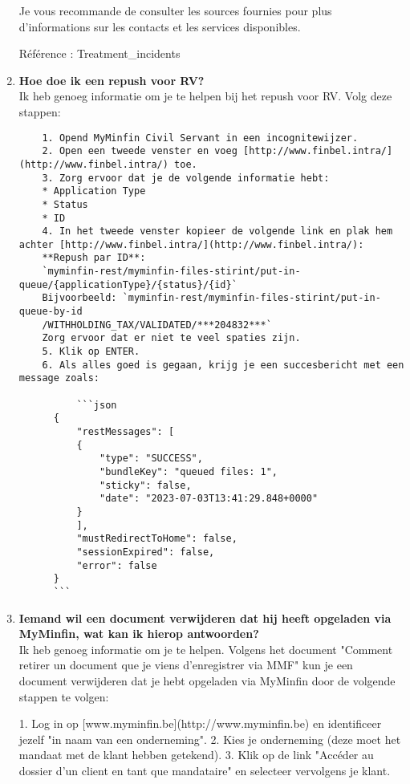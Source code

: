 \begin{enumerate}
    Je vous recommande de consulter les sources fournies pour plus d'informations sur les contacts et les services disponibles.
    
    Référence : Treatment\_incidents
    
    
    \item \textbf{Hoe doe ik een repush voor RV?} \\
    
    Ik heb genoeg informatie om je te helpen bij het repush voor RV. Volg deze stappen:
    \begin{verbatim}
    1. Opend MyMinfin Civil Servant in een incognitewijzer.
    2. Open een tweede venster en voeg [http://www.finbel.intra/](http://www.finbel.intra/) toe.
    3. Zorg ervoor dat je de volgende informatie hebt:
    * Application Type
    * Status
    * ID
    4. In het tweede venster kopieer de volgende link en plak hem achter [http://www.finbel.intra/](http://www.finbel.intra/):
    **Repush par ID**:
    `myminfin-rest/myminfin-files-stirint/put-in-queue/{applicationType}/{status}/{id}`
    Bijvoorbeeld: `myminfin-rest/myminfin-files-stirint/put-in-queue-by-id
    /WITHHOLDING_TAX/VALIDATED/***204832***`
    Zorg ervoor dat er niet te veel spaties zijn.
    5. Klik op ENTER.
    6. Als alles goed is gegaan, krijg je een succesbericht met een message zoals:
    
          ```json
      {
          "restMessages": [
          {
              "type": "SUCCESS",
              "bundleKey": "queued files: 1",
              "sticky": false,
              "date": "2023-07-03T13:41:29.848+0000"
          }
          ],
          "mustRedirectToHome": false,
          "sessionExpired": false,
          "error": false
      }
      ```
    \end{verbatim}
    
    \item \textbf{Iemand wil een document verwijderen dat hij heeft opgeladen via MyMinfin, wat kan ik hierop antwoorden?} \\
    Ik heb genoeg informatie om je te helpen. Volgens het document "Comment retirer un document que je viens d'enregistrer via MMF" kun je een document verwijderen dat je hebt opgeladen via MyMinfin door de volgende stappen te volgen:
    
    1. Log in op [www.myminfin.be](http://www.myminfin.be) en identificeer jezelf "in naam van een onderneming".
    2. Kies je onderneming (deze moet het mandaat met de klant hebben getekend).
    3. Klik op de link "Accéder au dossier d'un client en tant que mandataire" en selecteer vervolgens je klant.
    

\end{enumerate}
